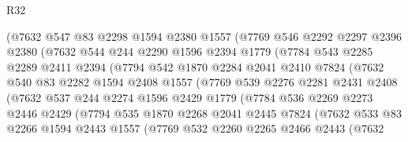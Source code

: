 \begin{lexlean}{R32}
\begin{coremodule}
              (@7632
                @547
                @83
                @2298
                @1594
                @2380
                @1557
                (@7769
                  @546
                  @2292
                  @2297
                  @2396
                  @2380
                  (@7632
                    @544
                    @244
                    @2290
                    @1596
                    @2394
                    @1779
                    (@7784
                      @543
                      @2285
                      @2289
                      @2411
                      @2394
                      (@7794
                        @542
                        @1870
                        @2284
                        @2041
                        @2410
                        @7824
                        (@7632
                          @540
                          @83
                          @2282
                          @1594
                          @2408
                          @1557
                          (@7769
                            @539
                            @2276
                            @2281
                            @2431
                            @2408
                            (@7632
                              @537
                              @244
                              @2274
                              @1596
                              @2429
                              @1779
                              (@7784
                                @536
                                @2269
                                @2273
                                @2446
                                @2429
                                (@7794
                                  @535
                                  @1870
                                  @2268
                                  @2041
                                  @2445
                                  @7824
                                  (@7632
                                    @533
                                    @83
                                    @2266
                                    @1594
                                    @2443
                                    @1557
                                    (@7769
                                      @532
                                      @2260
                                      @2265
                                      @2466
                                      @2443
                                      (@7632

\end{coremodule}
\end{lexlean}
